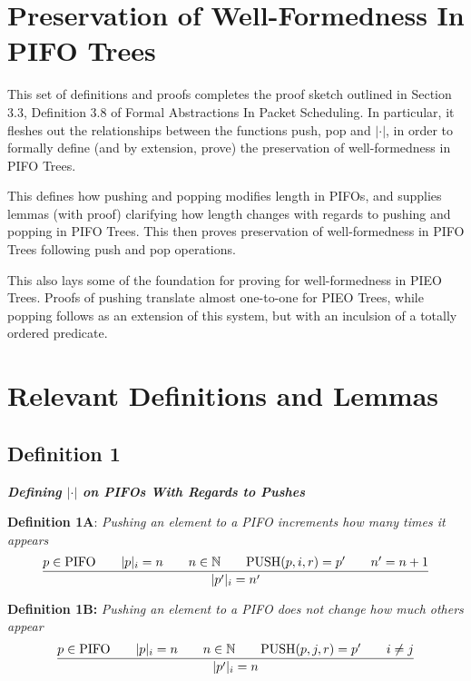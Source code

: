 \documentclass{article}
\begin{document}
\section{Preservation of Well-Formedness In PIFO Trees}

\noindent This set of definitions and proofs completes the proof sketch outlined in Section 3.3, Definition 3.8 of Formal Abstractions In Packet Scheduling. In particular, it fleshes out the relationships between the functions push, pop and $|\cdot|$, in order to formally define (and by extension, prove) the preservation of well-formedness in PIFO Trees.\newline

\noindent This defines how pushing and popping modifies length in PIFOs, and supplies lemmas (with proof) clarifying how length changes with regards to pushing and popping in PIFO Trees. This then proves preservation of well-formedness in PIFO Trees following push and pop operations.\newline

\noindent This also lays some of the foundation for proving for well-formedness in PIEO Trees. Proofs of pushing translate almost one-to-one for PIEO Trees, while popping follows as an extension of this system, but with an inculsion of a totally ordered predicate.

\section{Relevant Definitions and Lemmas}

\subsection{Definition 1}

\noindent \textbf{\textit{Defining $|\cdot|$ on PIFOs With Regards to Pushes}}

\hfill \break 

\noindent \textbf{Definition 1A}: \textit{Pushing an element to a PIFO increments how many times it appears}
 $$\frac{p \in \text{PIFO}  \hspace{0.7cm} |p|_i = n \hspace{0.7cm} n \in \mathbb{N} \hspace{0.7cm} \text{PUSH}(p, i, r) = p' \hspace{0.7cm} n' = n+1}{|p'|_i = n'}$$

\noindent \textbf{Definition 1B:} \textit{Pushing an element to a PIFO does not change how much others appear}
$$\frac{p \in \text{PIFO}  \hspace{0.7cm} |p|_i = n \hspace{0.7cm} n \in \mathbb{N} \hspace{0.7cm} \text{PUSH}(p, j, r) = p' \hspace{0.7cm} i \neq j}{|p'|_i = n}$$
\end{document}

